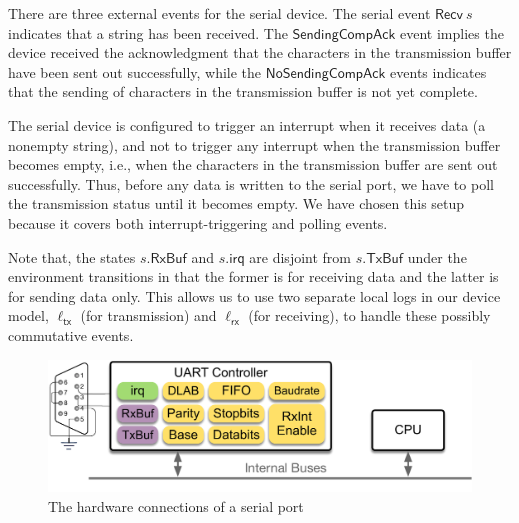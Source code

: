 There are three external events for the serial device. The serial event
$\textsf{Recv}~ s$ indicates that a string has been received. The
$\textsf{SendingCompAck}$ event implies the device received the acknowledgment
that the characters in the transmission buffer have been sent out successfully,
while the $\textsf{NoSendingCompAck}$ events indicates that the sending of
characters in the transmission buffer is not yet complete.

The serial device is configured to trigger an interrupt when it receives data (a
nonempty string), and not to trigger any interrupt when the transmission buffer
becomes empty, i.e., when the characters in the transmission buffer are sent out
successfully. Thus, before any data is written to the serial port, we have to
poll the transmission status until it becomes empty. We have chosen this setup
because it covers both interrupt-triggering and polling events.

Note that, the states $s.\mathsf{RxBuf}$ and $s.\mathsf{irq}$ are disjoint from
$s.\mathsf{TxBuf}$ under the environment transitions in that the former is for
receiving data and the latter is for sending data only.  This allows us to use
two separate local logs in our device model, $\ell_{\textsf{tx}}$ (for
transmission) and $\ell_{\textsf{rx}}$ (for receiving), to handle these possibly
commutative events.

\begin{figure}
	\begin{center}
		\includegraphics[scale=0.4]{figs/serial}
	\end{center}
	\caption{The hardware connections of a serial port}
	\label{fig:serial}
\end{figure}

